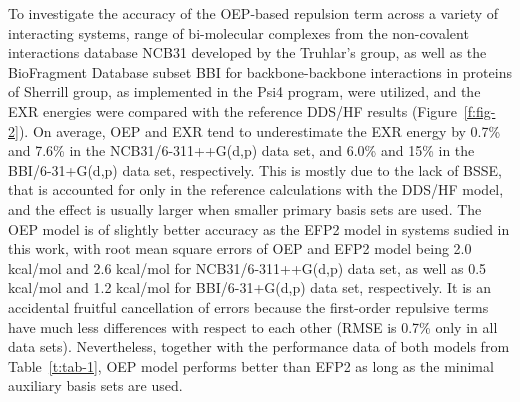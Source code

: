 To investigate the accuracy of the OEP\hyp{}based repulsion
term across
a variety of
interacting systems, range of
bi\hyp{}molecular complexes from the non\hyp{}covalent
interactions database NCB31 developed by the Truhlar's 
group,\cite{Zhao.Schultz.Truhlar.JCTC.2006,
Zhao.Truhlar.JCTC.2005,Zhao.Schultz.Truhlar.JCTC.2006,Zhao.Schultz.Truhlar.JCP.2005}
as well as the BioFragment Database subset BBI for backbone\hyp{}backbone
interactions in proteins of Sherrill group,\cite{Burns.Faver.Zheng.Marshall.Smith.Vanommeslaeghe.MacKerell.Merz.Sherrill.JCP.2017} 
as implemented in the {\sc Psi4}
program,\cite{Psi4.JCTC.2017}
were utilized, and the
EXR energies were compared with the reference DDS/HF results (Figure~\ref{f:fig-2}).
On average, OEP and EXR tend to underestimate the EXR energy by 0.7\% and 7.6\%
in the NCB31/6-311++G(d,p) data set, and 6.0\% and 15\% in the BBI/6-31+G(d,p) data set,
respectively.
This is mostly due to the lack of BSSE, that is accounted for
only in the reference calculations with the DDS/HF model, and the effect is usually larger
when smaller primary basis sets are used.
The OEP model is of slightly better accuracy as the EFP2 model
in systems sudied in this work, with 
root mean square errors of OEP and EFP2 model being
2.0 kcal/mol and 2.6 kcal/mol for NCB31/6-311++G(d,p) data set, 
as well as
0.5 kcal/mol and 1.2 kcal/mol for BBI/6-31+G(d,p) data set, respectively.
It is an accidental fruitful cancellation of errors because
the first\hyp{}order repulsive terms have much less differences with respect to each other
(RMSE is 0.7\% only in all data sets).
Nevertheless, together with the performance data of both models
from Table~\ref{t:tab-1}, OEP model performs better than EFP2 as long as the minimal
auxiliary basis sets are used.


